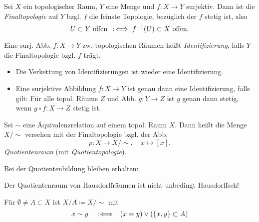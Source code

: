 \documentclass{cheat-sheet}
\begin{document}
\begin{defn}
  Sei $X$ ein topologischer Raum, $Y$ eine Menge und $f : X \to Y$ surjektiv. Dann ist die \emph{Finaltopologie} auf $Y$ bzgl. $f$ die feinste Topologie, bezüglich der $f$ stetig ist, also
  \[ U \subset Y \text{ offen} \enspace:\!\iff f^{-1}(U) \subset X \text{ offen}. \]
\end{defn}

\begin{defn}
  Eine surj. Abb. $f \!:\! X \!\to\! Y$ zw. topologischen Räumen heißt \emph{Identifizierung}, falls
  $Y$ die Finaltopologie bzgl. $f$ trägt.
\end{defn}

\begin{prop}
  \begin{itemize}
    \item Die Verkettung von Identifizierungen ist wieder eine Identifizierung.
    \item Eine surjektive Abbildung $f : X  \to Y$ ist genau dann eine Identifizierung, falls gilt: Für alle topol. Räume $Z$ und Abb. $g : Y \to Z$ ist $g$ genau dann stetig, wenn $g \circ f : X \to Z$ stetig ist.
  \end{itemize}
\end{prop}

\begin{defn}
  Sei ${\sim}$ eine Äquivalenzrelation auf einem topol. Raum $X$. Dann heißt die Menge $X/{\sim}$ versehen mit der Finaltopologie bzgl. der Abb.
  \[ p : X \to X/{\sim}, \quad x \mapsto [x]. \]
   \emph{Quotientenraum} (mit \emph{Quotientopologie}).
\end{defn}

\begin{bem}
  Bei der Quotientenbildung bleiben erhalten: \\
   \enspace
   \enspace
\end{bem}

\begin{acht}
  Der Quotientenraum von Hausdorffräumen ist nicht unbedingt Hausdorffsch!
\end{acht}

\begin{nota}
  Für $\emptyset \not= A \subset X$ ist $X/A \coloneqq X/{\sim}$ mit
  \[ x \sim y \enspace \enspace:\!\iff \enspace (x = y) \vee (\{ x, y \} \subset A) \]
\end{nota}
\end{document}
